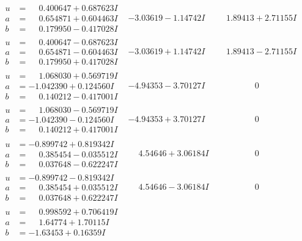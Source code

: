 \documentclass[1p]{elsarticle_modified}
\theoremstyle{definition}
\begin{document}
$$\begin{array}{c|c|c}
\begin{aligned}
u &= \phantom{-}0.400647 + 0.687623 I \\
a &= \phantom{-}0.654871 + 0.604463 I \\
b &= \phantom{-}0.179950 - 0.417028 I\end{aligned}
 & -3.03619 - 1.14742 I & \phantom{-}1.89413 + 2.71155 I \\ \hline\begin{aligned}
u &= \phantom{-}0.400647 - 0.687623 I \\
a &= \phantom{-}0.654871 - 0.604463 I \\
b &= \phantom{-}0.179950 + 0.417028 I\end{aligned}
 & -3.03619 + 1.14742 I & \phantom{-}1.89413 - 2.71155 I \\ \hline\begin{aligned}
u &= \phantom{-}1.068030 + 0.569719 I \\
a &= -1.042390 + 0.124560 I \\
b &= \phantom{-}0.140212 - 0.417001 I\end{aligned}
 & -4.94353 - 3.70127 I & \phantom{-0.000000 } 0 \\ \hline\begin{aligned}
u &= \phantom{-}1.068030 - 0.569719 I \\
a &= -1.042390 - 0.124560 I \\
b &= \phantom{-}0.140212 + 0.417001 I\end{aligned}
 & -4.94353 + 3.70127 I & \phantom{-0.000000 } 0 \\ \hline\begin{aligned}
u &= -0.899742 + 0.819342 I \\
a &= \phantom{-}0.385454 - 0.035512 I \\
b &= \phantom{-}0.037648 - 0.622247 I\end{aligned}
 & \phantom{-}4.54646 + 3.06184 I & \phantom{-0.000000 } 0 \\ \hline\begin{aligned}
u &= -0.899742 - 0.819342 I \\
a &= \phantom{-}0.385454 + 0.035512 I \\
b &= \phantom{-}0.037648 + 0.622247 I\end{aligned}
 & \phantom{-}4.54646 - 3.06184 I & \phantom{-0.000000 } 0 \\ \hline\begin{aligned}
u &= \phantom{-}0.998592 + 0.706419 I \\
a &= \phantom{-}1.64774 + 1.70115 I \\
b &= -1.63453 + 0.16359 I\end{aligned}

\end{array}$$
\end{document}
